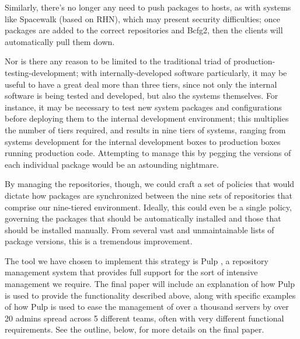 Similarly, there's no longer any need to push packages to hosts, as
with systems like Spacewalk (based on RHN), which may present security
difficulties; once packages are added to the correct repositories and
Bcfg2, then the clients will automatically pull them down.

Nor is there any reason to be limited to the traditional triad of
production-testing-development; with internally-developed software
particularly, it may be useful to have a great deal more than three
tiers, since not only the internal software is being tested and
developed, but also the systems themselves.  For instance, it may be
necessary to test new system packages and configurations before
deploying them to the internal development environment; this
multiplies the number of tiers required, and results in nine tiers of
systems, ranging from systems development for the internal development
boxes to production boxes running production code.  Attempting to
manage this by pegging the versions of each individual package would
be an astounding nightmare.

By managing the repositories, though, we could craft a set of policies
that would dictate how packages are synchronized between the nine sets
of repositories that comprise our nine-tiered environment.  Ideally,
this could even be a single policy, governing the packages that should
be automatically installed and those that should be installed
manually.  From several vast and unmaintainable lists of package
versions, this is a tremendous improvement.

The tool we have chosen to implement this strategy is Pulp
\cite{Dob11}, a repository management system that provides full
support for the sort of intensive management we require.  The final
paper will include an explanation of how Pulp is used to provide the
functionality described above, along with specific examples of how
Pulp is used to ease the management of over a thousand servers by over
20 admins spread across 5 different teams, often with very different
functional requirements.  See the outline, below, for more details on
the final paper.
